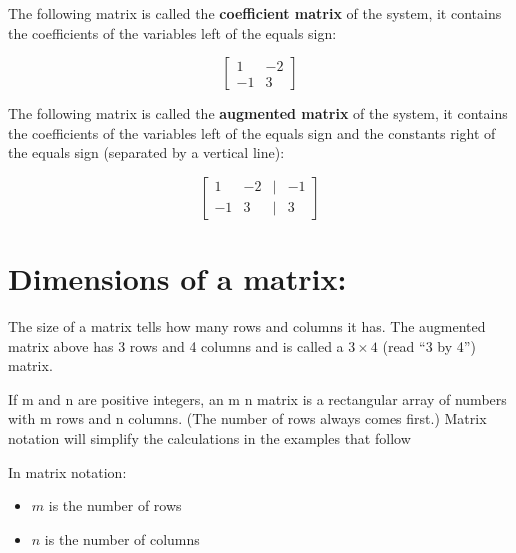 \documentclass[
  letterpaper,
  DIV=11,
  numbers=noendperiod]{scrreprt}
\providecommand{\tightlist}{%
  \setlength{\itemsep}{0pt}\setlength{\parskip}{0pt}}\usepackage{longtable,booktabs,array}
\begin{document}
The following matrix is called the \textbf{coefficient matrix} of the
system, it contains the coefficients of the variables left of the equals
sign:

\[
\begin{bmatrix}
1 & -2\\
-1 & 3
\end{bmatrix}
\]

The following matrix is called the \textbf{augmented matrix} of the
system, it contains the coefficients of the variables left of the equals
sign and the constants right of the equals sign (separated by a vertical
line):

\[
\begin{bmatrix}
1 & -2 &|& -1\\
-1 & 3 &|& 3
\end{bmatrix}
\]

\hypertarget{dimensions-of-a-matrix}{%
\section*{Dimensions of a matrix:}\label{dimensions-of-a-matrix}}


The size of a matrix tells how many rows and columns it has. The
augmented matrix above has 3 rows and 4 columns and is called a
\(3 \times 4\) (read ``3 by 4'') matrix.

If m and n are positive integers, an m n matrix is a rectangular array
of numbers with m rows and n columns. (The number of rows always comes
first.) Matrix notation will simplify the calculations in the examples
that follow

\begin{tcolorbox}[enhanced jigsaw, title=\textcolor{quarto-callout-tip-color}{\faLightbulb}\hspace{0.5em}{Tip}, bottomtitle=1mm, breakable, arc=.35mm, colframe=quarto-callout-tip-color-frame, leftrule=.75mm, colback=white, left=2mm, colbacktitle=quarto-callout-tip-color!10!white, titlerule=0mm, rightrule=.15mm, opacityback=0, toptitle=1mm, bottomrule=.15mm, toprule=.15mm, coltitle=black, opacitybacktitle=0.6]

In matrix notation:

\begin{itemize}
\tightlist
\item
  \(m\) is the number of rows
\item
  \(n\) is the number of columns
\end{itemize}

\end{tcolorbox}
\end{document}
